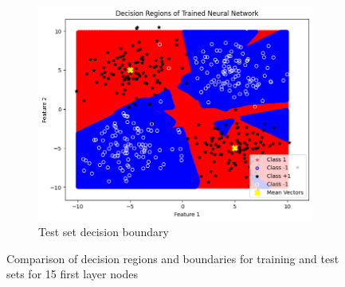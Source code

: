 \documentclass[a4paper,12pt]{article}
\begin{document}
\begin{figure}[H]
    \begin{subfigure}{0.45\textwidth}
        \centering
        \includegraphics[width=\textwidth]{3.2_15_Test.png}
        \caption{Test set decision boundary}
    \end{subfigure}

    \caption{Comparison of decision regions and boundaries for training and test sets for 15 first layer nodes} 
\end{figure}
\end{document}
